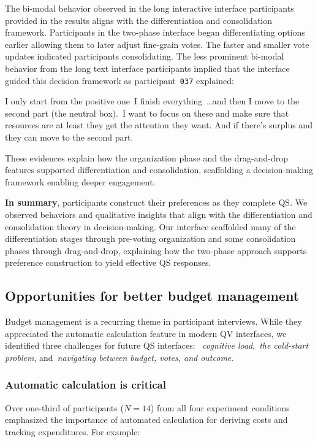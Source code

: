 The bi-modal behavior observed in the long interactive interface participants provided in the results aligns with the differentiation and consolidation framework. Participants in the two-phase interface began differentiating options earlier allowing them to later adjust fine-grain votes. The faster and smaller vote updates indicated participants consolidating. The less prominent bi-modal behavior from the long text interface participants implied that the interface guided this decision framework as participant~\texttt{037} explained:

\begin{displayquote}
    I only start from the positive one~\bracketellipsis I finish everything~\ldots and then I move to the second part (the neutral box).~\bracketellipsis I want to focus on these and make sure that resources are at least they get the attention they want. And if there's surplus and they can move to the second part. \hfill{}
\end{displayquote}

These evidences explain how the organization phase and the drag-and-drop features supported differentiation and consolidation, scaffolding a decision-making framework enabling deeper engagement.

\textbf{In summary}, participants construct their preferences as they complete QS. We observed behaviors and qualitative insights that align with the differentiation and consolidation theory in decision-making. Our interface scaffolded many of the differentiation stages through pre-voting organization and some consolidation phases through drag-and-drop, explaining how the two-phase approach supports preference construction to yield effective QS responses.

\subsection{Opportunities for better budget management}
Budget management is a recurring theme in participant interviews. While they appreciated the automatic calculation feature in modern QV interfaces, we identified three challenges for future QS interfaces: ~\textit{cognitive load},~\textit{the cold-start problem}, and~\textit{navigating between budget, votes, and outcome}.

\subsubsection{Automatic calculation is critical}
Over one-third of participants ($N=14$) from all four experiment conditions emphasized the importance of automated calculation for deriving costs and tracking expenditures. For example:


